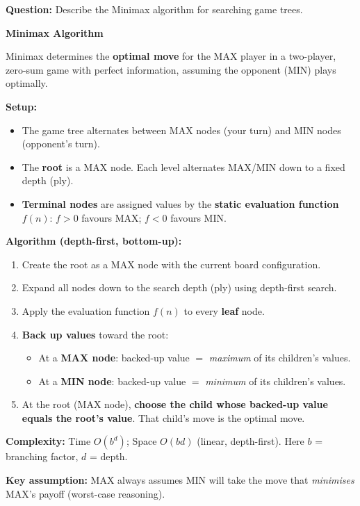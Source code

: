 \documentclass[12pt, a4paper]{article}
\newenvironment{answerbox}{\begin{mdframed}[style=answerframe]}{\end{mdframed}}
\begin{document}
\textbf{Question:} Describe the Minimax algorithm for searching game trees.

\begin{answerbox}
\textbf{Minimax Algorithm}

Minimax determines the \textbf{optimal move} for the MAX player in a two-player, zero-sum game with perfect information, assuming the opponent (MIN) plays optimally.

\textbf{Setup:}
\begin{itemize}[noitemsep]
  \item The game tree alternates between MAX nodes (your turn) and MIN nodes (opponent's turn).
  \item The \textbf{root} is a MAX node. Each level alternates MAX/MIN down to a fixed depth (ply).
  \item \textbf{Terminal nodes} are assigned values by the \textbf{static evaluation function} $f(n)$: $f > 0$ favours MAX; $f < 0$ favours MIN.
\end{itemize}

\textbf{Algorithm (depth-first, bottom-up):}
\begin{enumerate}[noitemsep]
  \item Create the root as a MAX node with the current board configuration.
  \item Expand all nodes down to the search depth (ply) using depth-first search.
  \item Apply the evaluation function $f(n)$ to every \textbf{leaf} node.
  \item \textbf{Back up values} toward the root:
    \begin{itemize}[noitemsep]
      \item At a \textbf{MAX node}: backed-up value $=$ \textit{maximum} of its children's values.
      \item At a \textbf{MIN node}: backed-up value $=$ \textit{minimum} of its children's values.
    \end{itemize}
  \item At the root (MAX node), \textbf{choose the child whose backed-up value equals the root's value}. That child's move is the optimal move.
\end{enumerate}

\textbf{Complexity:} Time $O(b^d)$; Space $O(bd)$ (linear, depth-first). Here $b$ = branching factor, $d$ = depth.

\textbf{Key assumption:} MAX always assumes MIN will take the move that \textit{minimises} MAX's payoff (worst-case reasoning).
\end{answerbox}
\end{document}
